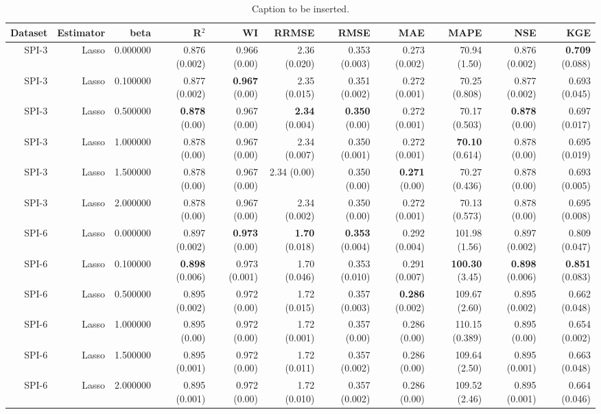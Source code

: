 \begin{table}
\caption{Caption to be inserted.}
\label{sp__comparison_datasets_table}
\begin{tabular}{rrrrrrrrrrr}
\toprule
Dataset & Estimator & beta & R$^2$ & WI & RRMSE & RMSE & MAE & MAPE & NSE & KGE \\
\midrule
 SPI-3 & Lasso & 0.000000 & 0.876 (0.002) & 0.966 (0.00) & 2.36 (0.020) & 0.353 (0.003) & 0.273 (0.002) & 70.94 (1.50) & 0.876 (0.002) & { \bf 0.709} (0.088) \\
 SPI-3 & Lasso & 0.100000 & 0.877 (0.002) & { \bf 0.967} (0.00) & 2.35 (0.015) & 0.351 (0.002) & 0.272 (0.001) & 70.25 (0.808) & 0.877 (0.002) & 0.693 (0.045) \\
 SPI-3 & Lasso & 0.500000 & { \bf 0.878} (0.00) & 0.967 (0.00) & { \bf 2.34} (0.004) & { \bf 0.350} (0.00) & 0.272 (0.001) & 70.17 (0.503) & { \bf 0.878} (0.00) & 0.697 (0.017) \\
 SPI-3 & Lasso & 1.000000 & 0.878 (0.00) & 0.967 (0.00) & 2.34 (0.007) & 0.350 (0.001) & 0.272 (0.001) & { \bf 70.10} (0.614) & 0.878 (0.00) & 0.695 (0.019) \\
 SPI-3 & Lasso & 1.500000 & 0.878 (0.00) & 0.967 (0.00) & 2.34 (0.00) & 0.350 (0.00) & { \bf 0.271} (0.00) & 70.27 (0.436) & 0.878 (0.00) & 0.693 (0.005) \\
 SPI-3 & Lasso & 2.000000 & 0.878 (0.00) & 0.967 (0.00) & 2.34 (0.002) & 0.350 (0.00) & 0.272 (0.001) & 70.13 (0.573) & 0.878 (0.00) & 0.695 (0.008) \\
 SPI-6 & Lasso & 0.000000 & 0.897 (0.002) & { \bf 0.973} (0.00) & { \bf 1.70} (0.018) & { \bf 0.353} (0.004) & 0.292 (0.004) & 101.98 (1.56) & 0.897 (0.002) & 0.809 (0.047) \\
 SPI-6 & Lasso & 0.100000 & { \bf 0.898} (0.006) & 0.973 (0.001) & 1.70 (0.046) & 0.353 (0.010) & 0.291 (0.007) & { \bf 100.30} (3.45) & { \bf 0.898} (0.006) & { \bf 0.851} (0.083) \\
 SPI-6 & Lasso & 0.500000 & 0.895 (0.002) & 0.972 (0.00) & 1.72 (0.015) & 0.357 (0.003) & { \bf 0.286} (0.002) & 109.67 (2.60) & 0.895 (0.002) & 0.662 (0.048) \\
 SPI-6 & Lasso & 1.000000 & 0.895 (0.00) & 0.972 (0.00) & 1.72 (0.001) & 0.357 (0.00) & 0.286 (0.00) & 110.15 (0.389) & 0.895 (0.00) & 0.654 (0.002) \\
 SPI-6 & Lasso & 1.500000 & 0.895 (0.001) & 0.972 (0.00) & 1.72 (0.011) & 0.357 (0.002) & 0.286 (0.00) & 109.64 (2.50) & 0.895 (0.001) & 0.663 (0.048) \\
 SPI-6 & Lasso & 2.000000 & 0.895 (0.001) & 0.972 (0.00) & 1.72 (0.010) & 0.357 (0.002) & 0.286 (0.00) & 109.52 (2.46) & 0.895 (0.001) & 0.664 (0.046) \\

\end{tabular}
\end{table}
